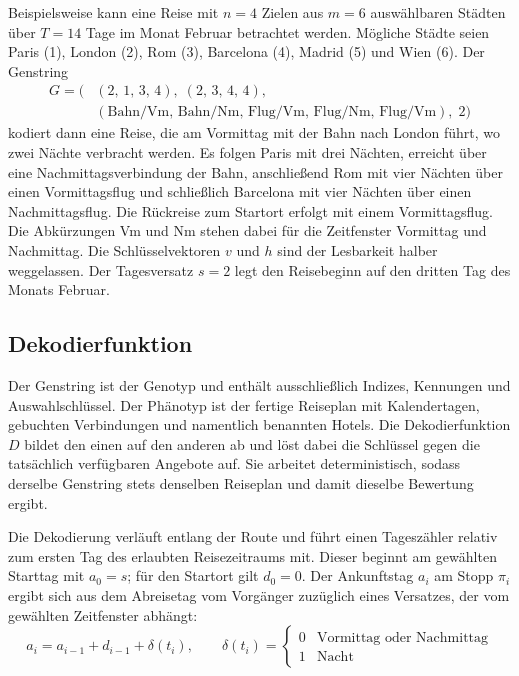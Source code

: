 Beispielsweise kann eine Reise mit $n = 4$ Zielen aus $m = 6$ auswählbaren Städten über $T = 14$ Tage im Monat Februar betrachtet werden. Mögliche Städte seien Paris (1), London (2), Rom (3), Barcelona (4), Madrid (5) und Wien (6). Der Genstring
\begin{align*}
G = \big(&(2,\, 1,\, 3,\, 4),\; (2,\, 3,\, 4,\, 4),\\
         &(\text{Bahn/Vm},\, \text{Bahn/Nm},\, \text{Flug/Vm},\, \text{Flug/Nm},\, \text{Flug/Vm}),\; 2\big)
\end{align*}
kodiert dann eine Reise, die am Vormittag mit der Bahn nach London führt, wo zwei Nächte verbracht werden. Es folgen Paris mit drei Nächten, erreicht über eine Nachmittagsverbindung der Bahn, anschließend Rom mit vier Nächten über einen Vormittagsflug und schließlich Barcelona mit vier Nächten über einen Nachmittagsflug. Die Rückreise zum Startort erfolgt mit einem Vormittagsflug. Die Abkürzungen Vm und Nm stehen dabei für die Zeitfenster Vormittag und Nachmittag. Die Schlüsselvektoren $v$ und $h$ sind der Lesbarkeit halber weggelassen. Der Tagesversatz $s = 2$ legt den Reisebeginn auf den dritten Tag des Monats Februar.

\subsection{Dekodierfunktion}
\label{subsec:dekodierung}

Der Genstring ist der Genotyp und enthält ausschließlich Indizes, Kennungen und Auswahlschlüssel. Der Phänotyp ist der fertige Reiseplan mit Kalendertagen, gebuchten Verbindungen und namentlich benannten Hotels. Die Dekodierfunktion $D$ bildet den einen auf den anderen ab und löst dabei die Schlüssel gegen die tatsächlich verfügbaren Angebote auf. Sie arbeitet deterministisch, sodass derselbe Genstring stets denselben Reiseplan und damit dieselbe Bewertung ergibt.

Die Dekodierung verläuft entlang der Route und führt einen Tageszähler relativ zum ersten Tag des erlaubten Reisezeitraums mit. Dieser beginnt am gewählten Starttag mit $a_0 = s$; für den Startort gilt $d_0 = 0$. Der Ankunftstag $a_i$ am Stopp $\pi_i$ ergibt sich aus dem Abreisetag vom Vorgänger zuzüglich eines Versatzes, der vom gewählten Zeitfenster abhängt:
\begin{equation}
a_i = a_{i-1} + d_{i-1} + \delta(t_i), \qquad
\delta(t_i) = \begin{cases} 0 & \text{Vormittag oder Nachmittag} \\ 1 & \text{Nacht} \end{cases}
\end{equation}

